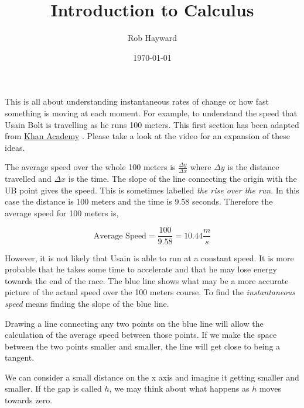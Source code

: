\documentclass[12pt, a4paper, oneside]{article}\usepackage[]{graphicx}\usepackage[]{color}
\begin{document}
\title{Introduction to Calculus}
\author{Rob Hayward}
\date{\today}
\maketitle
This is all about understanding instantaneous rates of change or how fast something is moving at each moment. For example, to understand the speed that Usain Bolt is travelling as he runs 100 meters. This first section has been adapted from \href{https://www.khanacademy.org/math/calculus/differential-calculus/intro_differential_calc/v/newton-leibniz-and-usain-bolt}{Khan Academy} 
\cite{Khan1}.  Please take a look at the video for an expansion of these ideas. 

\begin{figure}[h]
\end{figure}

The average speed over the whole 100  meters is $\frac{\Delta y}{\Delta x}$ where $\Delta y$ is the distance travelled and $\Delta x$ is the time. The slope of the line connecting the origin with the UB point gives the speed.  This is sometimes labelled \emph{the rise over the run}.  In this case the distance is 100 meters and the time is 9.58 seconds.  Therefore the average speed for 100 meters is,  

$$\text{Average Speed} = \frac{100}{9.58} = 10.44\frac{m}{s}$$

However, it is not likely that Usain is able to run at a constant speed.  It is more probable that he takes some time to accelerate and that he may lose energy towards the end of the race. The blue line shows what may be a more accurate picture of the actual speed over the 100 meters course.  To find the \emph{instantaneous speed} means finding the slope of the blue line. 

Drawing a line connecting any two points on the blue line will allow the calculation of the average speed between those points.  If we make the space between the two points smaller and smaller, the line will get close to being a tangent. 

We can consider a small distance on the x axis and imagine it getting smaller and smaller.  If the gap is called $h$, we may think about what happens as $h$ moves towards zero. 
\end{document}
